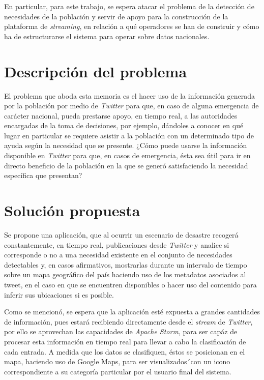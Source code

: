 En particular, para este trabajo, se espera atacar el problema de la detección de necesidades de la población y servir de apoyo para la construcción de la plataforma de \textit{streaming}, en relación a qué operadores se han de construir y cómo ha de estructurarse el sistema para operar sobre datos nacionales.

\section{Descripción del problema}
\label{intro:problema}

El problema que aboda esta memoria es el hacer uso de la información generada por la población por medio de \textit{Twitter} para que, en caso de alguna emergencia de carácter nacional, pueda prestarse apoyo, en tiempo real, a las autoridades encargadas de la toma de decisiones, por ejemplo, dándoles a conocer en qué lugar en particular se requiere asistir a la población con un determinado tipo de ayuda según la necesidad que se presente. ¿Cómo puede usarse la información disponible en \textit{Twitter} para que, en casos de emergencia, ésta sea útil para ir en directo beneficio de la población en la que se generó satisfaciendo la necesidad específica que presentan?

\section{Solución propuesta}
\label{intro:solucion}

Se propone una aplicación, que al ocurrir un escenario de desastre recogerá constantemente, en tiempo real, publicaciones desde \textit{Twitter} y analice si corresponde o no a una necesidad existente en el conjunto de necesidades detectables y, en casos afirmativos, mostrarlas durante un intervalo de tiempo sobre un mapa geográfico del país haciendo uso de los metadatos asociados al tweet, en el caso en que se encuentren disponibles o hacer uso del contenido para inferir sus ubicaciones si es posible.

Como se mencionó, se espera que la aplicación esté expuesta a grandes cantidades de información, pues estará recibiendo directamente desde el \textit{stream} de \textit{Twitter}, por ello se aprovechan las capacidades de \textit{Apache Storm}, para ser capáz de procesar esta información en tiempo real para llevar a cabo la clasificación de cada entrada. A medida que los datos se clasifiquen, éstos se posicionan en el mapa, haciendo uso de Google Maps, para ser visualizados´con un icono correspondiente a su categoría particular por el usuario final del sistema.

